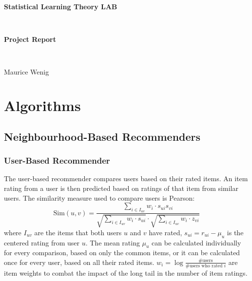 \documentclass[12pt]{scrartcl}
\begin{document}
\thispagestyle{empty}
\begin{center}
	\begin{LARGE}
		\textbf{Statistical Learning Theory LAB}
	\end{LARGE}\vspace{3mm}\\
	\begin{Large}
		\textbf{Project Report}
	\end{Large}\vspace{5mm}\\
	\begin{large}
		Maurice Wenig
	\end{large}
\end{center}
\tableofcontents
\clearpage


\fancyhead[LO,RE]{\itshape\nouppercase\leftmark}
\section{Algorithms}
\subsection[Neighbourhood]{Neighbourhood-Based Recommenders}
\subsubsection[User-Based]{User-Based Recommender}
The user-based recommender compares users based on their rated items. An item rating from a user is then predicted based on ratings of that item from similar users.
The similarity measure used to compare users is Pearson:
$$\text{Sim}(u, v) = \frac{\sum\limits_{i\in I_{uv}} w_i \cdot s_{ui} s_{vi}}{\sqrt{\sum\limits_{i\in I_{uv}} w_i \cdot  s_{ui}} \cdot \sqrt{\sum\limits_{i\in I_{uv}} w_i \cdot  z_{vi}}}$$
where $I_{uv}$ are the items that both users $u$ and $v$ have rated, $s_{ui} = r_{ui} - \mu_u$ is the centered rating from user $u$.
The mean rating $\mu_u$ can be calculated individually for every comparison, based on only the common items, or it can be calculated once for every user, based on all their rated items.
$w_i = \log\frac{\text{\# users}}{\text{\# users who rated } i}$ are item weights to combat the impact of the long tail in the number of item ratings.
\end{document}
